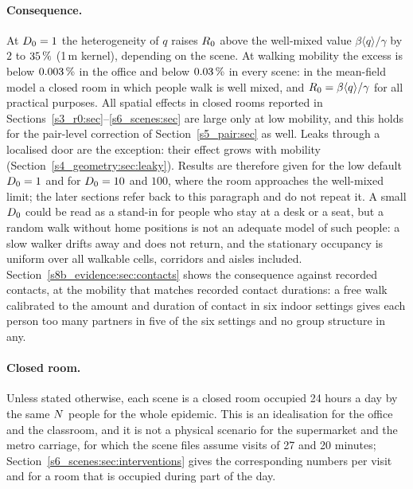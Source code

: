 \paragraph{Consequence.} At $D_0=1$ the heterogeneity of $q$ raises $R_0$ above the well-mixed value
$\beta\langle q\rangle/\gamma$ by $2$ to $35\,\%$ (1\,m kernel), depending on the scene. At walking mobility
the excess is below $0.003\,\%$ in the office and below $0.03\,\%$ in every scene: in the mean-field model a
closed room in which people walk is well mixed, and $R_0=\beta\langle q\rangle/\gamma$ for all practical
purposes.
All spatial effects in closed rooms reported in Sections~\ref{s3_r0:sec}--\ref{s6_scenes:sec} are large only at
low mobility, and this holds for the pair-level correction of Section~\ref{s5_pair:sec} as well. Leaks through
a localised door are the exception: their effect grows with mobility (Section~\ref{s4_geometry:sec:leaky}).
Results are therefore given for the low default $D_0=1$ and for $D_0=10$ and $100$, where the room approaches
the well-mixed limit; the later sections refer back to this paragraph and do not repeat it. A small $D_0$
could be read as a stand-in for people who stay at a desk or a seat, but a random walk without home positions
is not an adequate model of such people: a slow walker drifts away and does not return, and the stationary
occupancy is uniform over all walkable cells, corridors and aisles included. Section~\ref{s8b_evidence:sec:contacts}
shows the consequence against recorded contacts, at the mobility that matches recorded contact durations: a
free walk calibrated to the amount and duration of contact in six indoor settings gives each person too many
partners in five of the six settings and no group structure in any.

\paragraph{Closed room.} Unless stated otherwise, each scene is a closed room occupied 24 hours a day by the
same $N$ people for the whole epidemic. This is an idealisation for the office and the classroom, and it
is not a physical scenario for the supermarket and the metro carriage, for which the scene files assume visits
of 27 and 20 minutes;
Section~\ref{s6_scenes:sec:interventions} gives the corresponding numbers per visit and for a room that is
occupied during part of the day.
